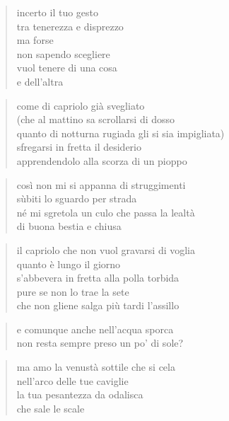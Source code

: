 \clearpage


	\begin{verse}
		incerto il tuo gesto\\
		tra tenerezza e disprezzo\\
		ma forse\\
		non sapendo scegliere\\
		vuol tenere di una cosa\\
		e dell'altra
	\end{verse}

\clearpage


	\begin{verse}
		come di capriolo già svegliato\\
		(che al mattino sa scrollarsi di dosso\\
		quanto di notturna rugiada gli si sia impigliata)\\
		sfregarsi in fretta il desiderio\\
		apprendendolo alla scorza di un pioppo
	\end{verse}

	\begin{verse}
		così non mi si appanna di struggimenti\\
		sùbiti lo sguardo per strada\\
		né mi sgretola un culo che passa la lealtà\\
		di buona bestia e chiusa
	\end{verse}

	\begin{verse}
		il capriolo che non vuol gravarsi di voglia\\
		quanto è lungo il giorno\\
		s'abbevera in fretta alla polla torbida\\
		pure se non lo trae la sete\\
		che non gliene salga più tardi l'assillo
	\end{verse}

	\begin{verse}
		e comunque anche nell’acqua sporca\\
		non resta sempre preso un po' di sole?
	\end{verse}

\clearpage


	\begin{verse}
		ma amo la venustà sottile che si cela\\
		nell'arco delle tue caviglie\\
		la tua pesantezza da odalisca\\
		che sale le scale
	\end{verse}

